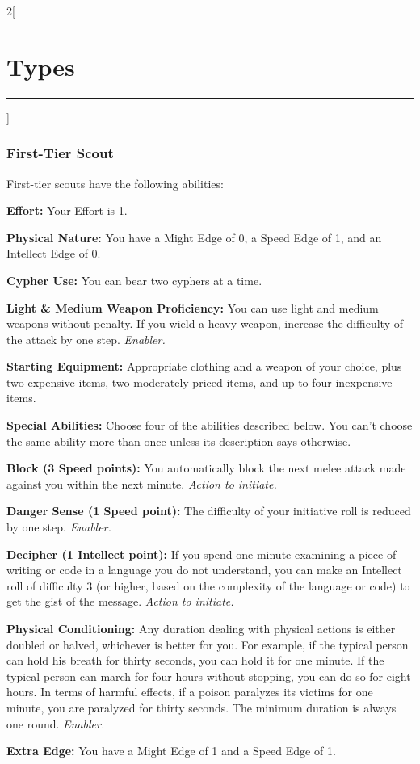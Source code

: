 \documentclass[a4paper,10pt,final]{book}
\newcommand{\HRule}{\rule{\linewidth}{0.5mm}} %
\newcommand{\newSection}[1]{\section*{#1} \addcontentsline{toc}{section}{#1} \label{sec:#1} \HRule}
\newcommand{\itemLine}[2]{\textbf{#1:} {#2}\par}
\newcommand{\itemAbility}[2]{\textcolor{25gray}{\textbullet\textbf{ #1:}} {#2}\par}
\newcommand{\enabler}{\textit{ Enabler.}}
\newcommand{\actionInit}{\textit{ Action to initiate.}}
\newenvironment{docsection}[1]
{
  \begin{multicols*}{2}[\newSection{#1}]
}
{
  \end{multicols*}
  \newpage
}
\begin{document}
\begin{docsection}{Types}

\subsubsection*{First-Tier Scout}
\label{subsub:scoutFirstTier}

First-tier scouts have the following abilities:

\itemLine{Effort}{Your Effort is 1.}

\itemLine{Physical Nature} {You have a Might Edge of 0, a Speed Edge of 1, and an Intellect Edge of 0.}

\itemLine{Cypher Use}{You can bear two cyphers at a time.}

\itemLine{Light \& Medium Weapon Proficiency} {You can use light and medium weapons without penalty. If you wield a heavy weapon, increase the difficulty of the attack by one step.\enabler}

\itemLine{Starting Equipment}{Appropriate clothing and a weapon of your choice, plus two expensive items, two moderately priced items, and up to four inexpensive items.}

\itemLine{Special Abilities}{Choose four of the abilities described below. You can’t choose the same ability more than once unless its description says otherwise.}

\itemAbility{Block (3 Speed points)}{You automatically block the next melee attack made against you within the next minute.\actionInit}

\itemAbility{Danger Sense (1 Speed point)}{The difficulty of your initiative roll is reduced by one step.\enabler}

\itemAbility{Decipher (1 Intellect point)}{If you spend one minute examining a piece of writing or code in a language you do not understand, you can make an Intellect roll of difficulty 3 (or higher, based on the complexity of the language or code) to get the gist of the message.\actionInit}

\itemAbility{Physical Conditioning}{Any duration dealing with physical actions is either doubled or halved, whichever is better for you. For example, if the typical person can hold his breath for thirty seconds, you can hold it for one minute. If the typical person can march for four hours without stopping, you can do so for eight hours. In terms of harmful effects, if a poison paralyzes its victims for one minute, you are paralyzed for thirty seconds. The minimum duration is always one round.\enabler} \itemAbility{Extra Edge}{You have a Might Edge of 1 and a Speed Edge of 1.}


\end{docsection}
\end{document}
